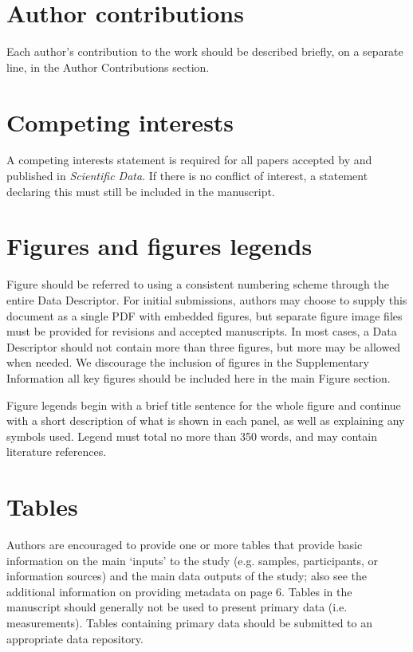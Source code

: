 \documentclass[english]{article}
\begin{document}
\section*{Author contributions}

Each author’s contribution to the work should be described briefly, on a separate line, in the Author Contributions section. 

\section*{Competing interests}

A competing interests statement is required for all papers accepted by and published in \emph{Scientific Data}. If there is no conflict of interest, a statement declaring this must still be included in the manuscript.


\section*{Figures and figures legends}

Figure should be referred to using a consistent numbering scheme through
the entire Data Descriptor. For initial submissions, authors may choose
to supply this document as a single PDF with embedded figures, but
separate figure image files must be provided for revisions and accepted
manuscripts. In most cases, a Data Descriptor should not contain more
than three figures, but more may be allowed when needed. We discourage
the inclusion of figures in the Supplementary Information \textendash{}
all key figures should be included here in the main Figure section. 

Figure legends begin with a brief title sentence for the whole figure
and continue with a short description of what is shown in each panel,
as well as explaining any symbols used. Legend must total no more
than 350 words, and may contain literature references. 


\section*{Tables}

Authors are encouraged to provide one or more tables that provide basic information on the main ‘inputs’ to the study (e.g. samples, participants, or information sources) and the main data outputs of the study; also see the additional information on providing metadata on page 6. Tables in the manuscript should generally not be used to present primary data (i.e. measurements). Tables containing primary data should be submitted to an appropriate data repository.
\end{document}
